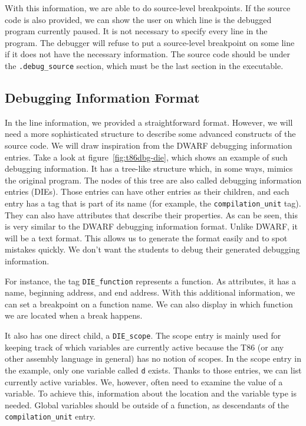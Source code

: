 With this information, we are able to do source-level breakpoints. If the
source code is also provided, we can show the user on which line is the
debugged program currently paused. It is not necessary to specify every line in
the program. The debugger will refuse to put a source-level breakpoint on some
line if it does not have the necessary information. The source code should be
under the \verb|.debug_source| section, which must be the last section in the
executable.

\subsection{Debugging Information Format}
In the line information, we provided a straightforward format. However, we will
need a more sophisticated structure to describe some advanced constructs of the
source code. We will draw inspiration from the DWARF debugging information entries.
Take a look at figure~\ref{fig:t86dbg-die}, which shows an example of such
debugging information. It has a tree-like structure which, in some ways, mimics
the original program. The nodes of this tree are also called debugging
information entries (DIEs). Those entries can have other entries as their
children, and each entry has a tag that is part of its name (for example, the
\verb|compilation_unit| tag). They can also have attributes that describe their
properties. As can be seen, this is very similar to the DWARF debugging
information format. Unlike DWARF, it will be a text format. This allows us to
generate the format easily and to spot mistakes quickly. We don't want the
students to debug their generated debugging information.

For instance, the tag \verb|DIE_function| represents a function. As attributes,
it has a name, beginning address, and end address. With this additional
information, we can set a breakpoint on a function name. We can also display in
which function we are located when a break happens.

It also has one direct child, a \verb|DIE_scope|. The scope entry is mainly
used for keeping track of which variables are currently active because the T86
(or any other assembly language in general) has no notion of scopes. In the
scope entry in the example, only one variable called \texttt{d} exists. Thanks
to those entries, we can list currently active variables. We, however, often
need to examine the value of a variable. To achieve this, information about the
location and the variable type is needed. Global variables should be outside of
a function, as descendants of the \verb|compilation_unit| entry.

